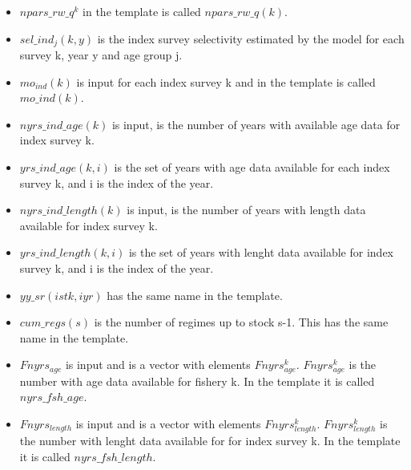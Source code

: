 \documentclass{article}
\begin{document}
\begin{itemize}
    \item $npars\_rw\_q^k$ in the template is called $npars\_rw\_q(k)$.
    \item $sel\_ind_j(k,y)$ is the index survey  selectivity estimated by the model for each survey k, year y and age group j. 
    
    \item $mo_{ind}(k)$ is input for each index survey k and in the template is called $mo\_ind(k)$.
    \item $nyrs\_ind\_age(k)$ is input, is the number of years with available age data for index survey k.
    \item $yrs\_ind\_age(k,i)$ is the set of years with   age data available for each index survey k, and i is the index of the year.
    
    
    
    
    \item $nyrs\_ind\_length(k)$ is input, is the number of years with length data available for index survey k.
    \item $yrs\_ind\_length(k,i)$ is the set of years with lenght data available for index survey k, and i is the index of the year.
    \item $yy\_sr(istk,iyr)$ has the same name in the template.
    \item $cum\_regs(s)$ is the number of regimes up to stock s-1. This has the same name in the template.
    \item $Fnyrs_{age}$ is input and  is a vector with elements $Fnyrs^k_{age}$. $Fnyrs^k_{age}$ is the number with age data available for fishery k. In the template it is called $nyrs\_fsh\_age$.
    \item $Fnyrs_{length}$ is input and  is a vector with elements $Fnyrs^k_{length}$. $Fnyrs^k_{length}$ is the number with lenght data available for for index survey k. In the template it is called $nyrs\_fsh\_length$.
    

\end{itemize}
\end{document}

